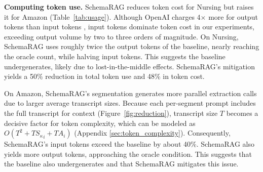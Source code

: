 \documentclass[11pt]{article}
\begin{document}
\textbf{Computing token use.} SchemaRAG reduces token cost for Nursing but raises it for Amazon (Table~\ref{tab:usage}). Although OpenAI charges 4$\times$ more for output tokens than input tokens \cite{OpenAI_pricing}, input tokens dominate token cost in our experiments, exceeding output volume by two to three orders of magnitude. 
On Nursing, SchemaRAG uses roughly twice the output tokens of the baseline, nearly reaching the oracle count, while halving input tokens.  
This suggests the baseline undergenerates, likely due to lost-in-the-middle effects. SchemaRAG's mitigation yields a 50\% reduction in total token use and 48\% in token cost.

On Amazon, SchemaRAG’s segmentation generates more parallel extraction calls due to larger average transcript sizes. 
Because each per-segment prompt includes the full transcript for context (Figure~\ref{fig:reduction}), transcript size $T$ becomes a decisive factor for token complexity, which can be modeled as $O(T^2 + T{S_\kappa}_i + TA_i)$ (Appendix \ref{sec:token_complexity}).
Consequently, SchemaRAG's input tokens exceed the baseline by about 40\%. 
SchemaRAG also yields more output tokens, approaching the oracle condition.
This suggests that the baseline also undergenerates and that SchemaRAG mitigates this issue.
\end{document}
